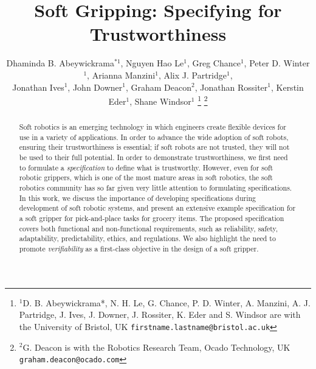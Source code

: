 \documentclass[letterpaper, 10 pt, conference]{ieeeconf}  %
\title{\LARGE \bf
	Soft Gripping: Specifying for Trustworthiness
}
\author{Dhaminda B. Abeywickrama$^{*1}$, Nguyen Hao Le$^{1}$, Greg Chance$^{1}$,  Peter D. Winter$^{1}$, Arianna Manzini$^{1}$, Alix J. Partridge$^{1}$, \\Jonathan Ives$^{1}$, John Downer$^{1}$, Graham Deacon$^{2}$, Jonathan Rossiter$^{1}$, Kerstin Eder$^{1}$, Shane Windsor$^{1}$%
\thanks{$^{1}$D. B. Abeywickrama*, N. H. Le, G. Chance, P. D. Winter, A. Manzini, A. J. Partridge, J. Ives, J. Downer, J. Rossiter,  K. Eder and S. Windsor are with the University of Bristol, UK
	{\tt\small firstname.lastname@bristol.ac.uk}}%
\thanks{$^{2}$G. Deacon is with the Robotics Research Team, Ocado Technology, UK
	{\tt\small graham.deacon@ocado.com}}%
}
\begin{document}
	
	
	
	\maketitle
	\thispagestyle{empty}
	\pagestyle{empty}
	
	
	\begin{abstract}
	Soft robotics is an emerging technology in which engineers create flexible devices for use in a variety of applications.
	In order to advance the wide adoption of soft robots, ensuring their trustworthiness is essential; if soft robots are not trusted, they will not be used to their full potential. 
	In order to demonstrate trustworthiness, we first need to formulate a \emph{specification} to define what is trustworthy. 
	However, even for soft robotic grippers, which is one of the most mature areas in soft robotics, the soft robotics community has so far given very little attention to formulating specifications. 
	In this work, we discuss the importance of developing specifications during development of soft robotic systems, and present an extensive example specification for a soft gripper for pick-and-place tasks for grocery items. The proposed specification covers both functional and non-functional requirements, such as reliability, safety, adaptability, predictability, ethics, and regulations.  
	We also highlight the need to promote \emph{verifiability} as a first-class objective in the design of a soft gripper.	
	\end{abstract}
	
\end{document}
